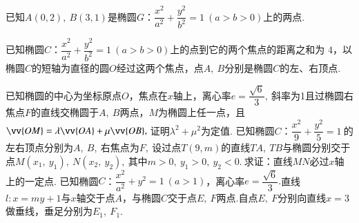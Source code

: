 \documentclass{BHCexam}
\begin{document}
\begin{questions}
\kongbai
\qs 已知$ A(0,2),~B(3,1) $是椭圆$G$：$\dfrac{x^2}{a^2}+\dfrac{y^2}{b^2}=1~(a>b>0)$上的两点.
\kongbai
\qs 已知椭圆$C$：$\dfrac{x^2}{a^2}+\dfrac{y^2}{b^2}=1~(a>b>0)$上的点到它的两个焦点的距离之和为 $ 4 $，以椭圆$ C $的短轴为直径的圆$ O $经过这两个焦点，点$ A,~B $分别是椭圆$ C $的左、右顶点.
\kongbai
\qs 已知椭圆的中心为坐标原点$ O $，焦点在$x$轴上，离心率$ e=\dfrac{\sqrt{6}}{3},~ $斜率为1且过椭圆右焦点$ F $的直线交椭圆于$ A,~B $两点，$ M $为椭圆上任一点，且$ \vv{OM}=\lambda\vv{OA}+\mu \vv{OB},~ $证明$ \lambda^2+\mu^2 $为定值.
\kongbai
\qs 已知椭圆$C$：$\dfrac{x^2}{9}+\dfrac{y^2}{5}=1~$的左右顶点分别为$ A,~B,~$右焦点为$ F ,~$设过点$ T(9,m) $的直线$ TA,~TB $与椭圆分别交于点$ M(x_1,~y_1),~N(x_2,~y_2) ,~$其中$ m>0,~y_1>0,~y_2<0.~ $求证：直线$ MN  $必过$x$轴上的一定点.
\kongbai
\qs 已知椭圆$C$：$\dfrac{x^2}{a^2}+y^2=1~(a>1)$，离心率$ e=\dfrac{\sqrt{6}}{3}. $直线$ l:x=my+1 $与$x$轴交于点$ A $，与椭圆$ C $交于点$ E,~F $两点.自点$ E,~F $分别向直线$ x=3 $做垂线，垂足分别为$ E_1,~F_1. $
\begin{parts}

\end{parts}
\end{questions}
\end{document}
